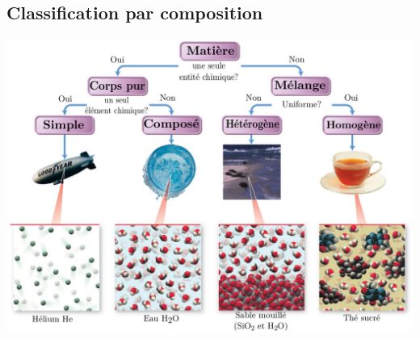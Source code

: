\documentclass[../../main/main.tex]{subfiles}
\begin{document}
\subsection{Classification par composition}

\begin{center}
	\includegraphics[width=.95\linewidth]{compo}
\end{center}
\end{document}
